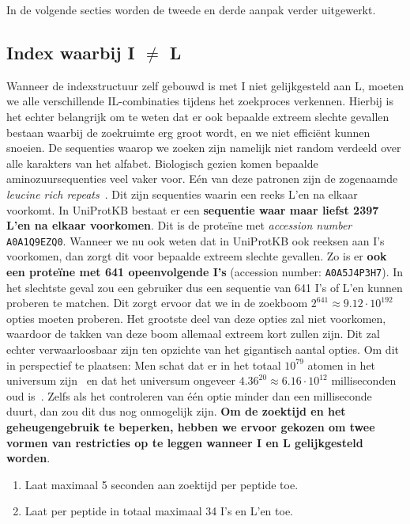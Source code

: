 In de volgende secties worden de tweede en derde aanpak verder uitgewerkt.

\subsection{Index waarbij I $\neq$ L}\label{subsec:index-waarbij-i-neq-l}
Wanneer de indexstructuur zelf gebouwd is met I niet gelijkgesteld aan L, moeten we alle verschillende IL-combinaties tijdens het zoekproces verkennen.
Hierbij is het echter belangrijk om te weten dat er ook bepaalde extreem slechte gevallen bestaan waarbij de zoekruimte erg groot wordt, en we niet efficiënt kunnen snoeien.
De sequenties waarop we zoeken zijn namelijk niet random verdeeld over alle karakters van het alfabet.
Biologisch gezien komen bepaalde aminozuursequenties veel vaker voor.
Eén van deze patronen zijn de zogenaamde \textit{leucine rich repeats}~\cite{leucine_rich_repeats}.
Dit zijn sequenties waarin een reeks L'en na elkaar voorkomt.
In UniProtKB bestaat er een \textbf{sequentie waar maar liefst 2397 L'en na elkaar voorkomen}.
Dit is de proteïne met \textit{accession number} \texttt{A0A1Q9EZQ0}.
Wanneer we nu ook weten dat in UniProtKB ook reeksen aan I's voorkomen, dan zorgt dit voor bepaalde extreem slechte gevallen.
Zo is er \textbf{ook een proteïne met 641 opeenvolgende I's} (accession number: \texttt{A0A5J4P3H7}).
In het slechtste geval zou een gebruiker dus een sequentie van 641 I's of L'en kunnen proberen te matchen.
Dit zorgt ervoor dat we in de zoekboom $2^{641} \approx 9.12 \cdot 10^{192}$ opties moeten proberen.
Het grootste deel van deze opties zal niet voorkomen, waardoor de takken van deze boom allemaal extreem kort zullen zijn.
Dit zal echter verwaarloosbaar zijn ten opzichte van het gigantisch aantal opties.
Om dit in perspectief te plaatsen: Men schat dat er in het totaal $10^{79}$ atomen in het universum zijn~\cite{atoms_in_universe} en dat het universum ongeveer $4.36^{20} \approx 6.16 \cdot 10^{12}$ milliseconden oud is~\cite{age_universe}.
Zelfs als het controleren van één optie minder dan een milliseconde duurt, dan zou dit dus nog onmogelijk zijn.
\textbf{Om de zoektijd en het geheugengebruik te beperken, hebben we ervoor gekozen om twee vormen van restricties op te leggen wanneer I en L gelijkgesteld worden}.
\begin{enumerate}
    \item Laat maximaal 5 seconden aan zoektijd per peptide toe.
    \item Laat per peptide in totaal maximaal 34 I's en L'en toe.
\end{enumerate}
